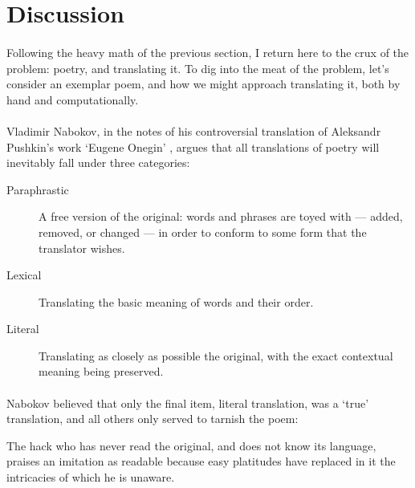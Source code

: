 \section*{Discussion}
\paragraph{}{Following the heavy math of the previous section, I
  return here to the crux of the problem: poetry, and translating
  it. To dig into the meat of the problem, let's consider an exemplar
  poem, and how we might approach translating it, both by hand and
  computationally. }

\paragraph{}{Vladimir Nabokov, in the notes of his controversial
  translation of Aleksandr Pushkin's work `Eugene Onegin'
  \cite{nabokov, nabokovtheory}, argues that all translations of poetry will
  inevitably fall under three categories:}
  \begin{description}
  \item [Paraphrastic] A free version of the original: words and
    phrases are toyed with --- added, removed, or changed --- in order
    to conform to some form that the translator wishes.
  \item [Lexical] Translating the basic meaning of words and their
    order.
  \item [Literal] Translating as closely as possible the original,
    with the exact contextual meaning being preserved.
  \end{description}

  \paragraph{}{Nabokov believed that only the final item, literal
    translation, was a `true' translation, and all others only served
    to tarnish the poem:}
  \begin{displayquote}
    The hack who has never read the original, and does not know its
    language, praises an imitation as readable because easy platitudes
    have replaced in it the intricacies of which he is unaware.
  \end{displayquote}
